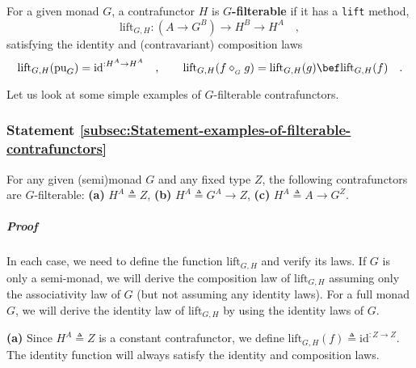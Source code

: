 For a given monad $G$, a contrafunctor $H$ is $G$\textbf{-filterable}
if it has a \lstinline!lift! method,
\[
\text{lift}_{G,H}:(A\rightarrow G^{B})\rightarrow H^{B}\rightarrow H^{A}\quad,
\]
satisfying the identity and (contravariant) composition laws
\[
\text{lift}_{G,H}(\text{pu}_{G})=\text{id}^{:H^{A}\rightarrow H^{A}}\quad,\quad\quad\text{lift}_{G,H}(f\diamond_{_{G}}g)=\text{lift}_{G,H}(g)\bef\text{lift}_{G,H}(f)\quad.
\]

Let us look at some simple examples of $G$-filterable contrafunctors.

\subsubsection{Statement \label{subsec:Statement-examples-of-filterable-contrafunctors}\ref{subsec:Statement-examples-of-filterable-contrafunctors}}

For any given (semi)monad $G$ and any fixed type $Z$, the following
contrafunctors are $G$-filterable: \textbf{(a)} $H^{A}\triangleq Z$,
\textbf{(b)} $H^{A}\triangleq G^{A}\rightarrow Z$, \textbf{(c)} $H^{A}\triangleq A\rightarrow G^{Z}$.

\subparagraph{Proof}

In each case, we need to define the function $\text{lift}_{G,H}$
and verify its laws. If $G$ is only a semi-monad, we will derive
the composition law of $\text{lift}_{G,H}$ assuming only the associativity
law of $G$ (but not assuming any identity laws). For a full monad
$G$, we will derive the identity law of $\text{lift}_{G,H}$ by using
the identity laws of $G$. 

\textbf{(a)} Since $H^{A}\triangleq Z$ is a constant contrafunctor,
we define $\text{lift}_{G,H}(f)\triangleq\text{id}^{:Z\rightarrow Z}$.
The identity function will always satisfy the identity and composition
laws.

